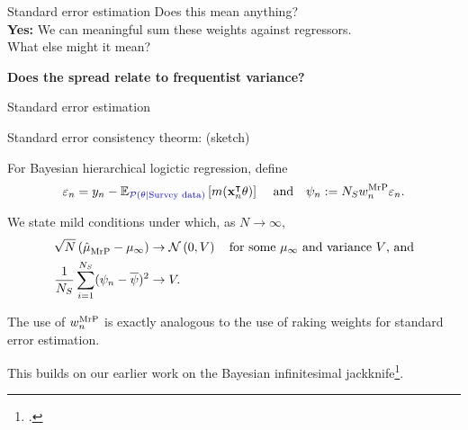 




\begin{frame}[c]{Standard error estimation}
\centering
{
Does this mean anything?  \\
\textbf{Yes: }We can meaningful sum these weights against regressors.\\[1em]
What else might it mean?\\
}

{
\textbf{Does the spread relate to frequentist variance?}
}

\splitpagenoline{
    \AlexanderWeightPlot{}
}{
    \LaxWeightPlot{}
}
\end{frame}




\begin{frame}[c]{Standard error estimation}



\begin{block}{Standard error consistency theorm: (sketch)}

For Bayesian hierarchical logictic regression, define
$$
\varepsilon_n = y_n - \mathbb{E}_{\textcolor{blue}{\mathcal{P}(\theta \vert \textrm{Survey data})}}\left[ m(\mathbf{x}_n^\intercal \theta)\right]\,
\quad\textrm{and}\quad
\psi_n := {N_S} w_n^{\mathrm{MrP}} \varepsilon_n.
$$

We state mild conditions under which, as $N \rightarrow \infty$,
$$
\begin{aligned}
    \sqrt{N}\left(\hat{\mu}^{}_{\mathrm{MrP}} - \mu_\infty \right) \rightarrow{}&
    \mathcal{N}\left(0, V\right) \quad\textrm{for some $\mu_\infty$ and variance $V$, and}\\
\frac{1}{{N_S}} \sum_{i=1}^{N_S} (\psi_n - \overline{\psi})^2 \rightarrow{}& V.
\end{aligned}
$$
\end{block}

The use of $w_n^{\mathrm{MrP}}$ is exactly analogous to the use of raking weights
for standard error estimation.

This builds on our earlier work on the Bayesian
infinitesimal jackknife\footcite{giordano:2024:bayesij}.

\end{frame}

